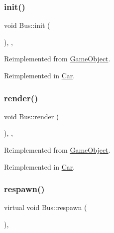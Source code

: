 \subsubsection{\texorpdfstring{init()}{init()}}
{\footnotesize\ttfamily void Bus\+::init (\begin{DoxyParamCaption}{ }\end{DoxyParamCaption})\hspace{0.3cm}{\ttfamily [inline]}, {\ttfamily [override]}, {\ttfamily [virtual]}}



Reimplemented from \hyperlink{class_game_object_aecb2c1b9f69715d854f7604d5d7978ec}{Game\+Object}.



Reimplemented in \hyperlink{class_car_ae7d4da15bf41cc2d36465129372f2a71}{Car}.

\mbox{\label{class_bus_a0fe709af4b2ca86583d8647f323c231c}} 
\subsubsection{\texorpdfstring{render()}{render()}}
{\footnotesize\ttfamily void Bus\+::render (\begin{DoxyParamCaption}{ }\end{DoxyParamCaption})\hspace{0.3cm}{\ttfamily [inline]}, {\ttfamily [override]}, {\ttfamily [virtual]}}



Reimplemented from \hyperlink{class_game_object_a484efb66a7a27c101e84c11d9905d7a6}{Game\+Object}.



Reimplemented in \hyperlink{class_car_a52c7156c403d267444de3d4813fffba2}{Car}.

\mbox{\label{class_bus_a4f917c97b2fc287fc9b01795250f591d}} 
\subsubsection{\texorpdfstring{respawn()}{respawn()}}
{\footnotesize\ttfamily virtual void Bus\+::respawn (\begin{DoxyParamCaption}{ }\end{DoxyParamCaption})\hspace{0.3cm}{\ttfamily [inline]}, {\ttfamily [virtual]}}

